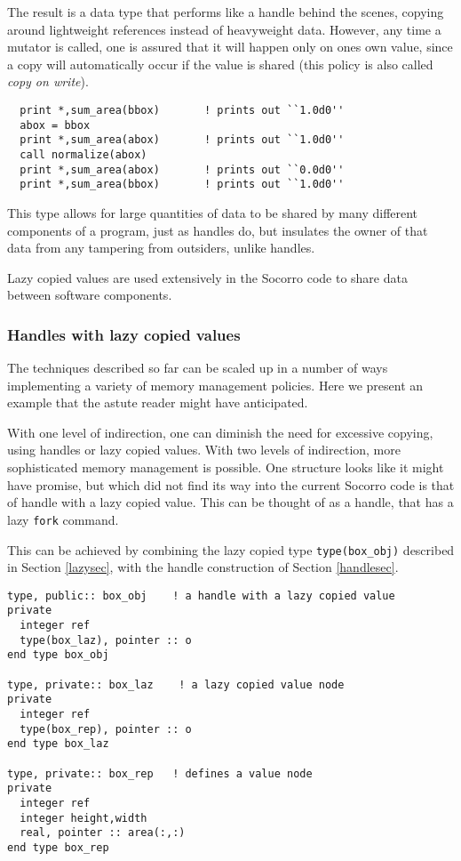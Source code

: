 The result is a data type that performs like a handle behind the
scenes, copying around lightweight references instead of heavyweight
data.  However, any time a mutator is called, one is assured that it
will happen only on ones own value, since a copy will automatically
occur if the value is shared (this policy is also called
{\em copy on write}).
\begin{verbatim}
  print *,sum_area(bbox)       ! prints out ``1.0d0''
  abox = bbox
  print *,sum_area(abox)       ! prints out ``1.0d0''
  call normalize(abox)
  print *,sum_area(abox)       ! prints out ``0.0d0''
  print *,sum_area(bbox)       ! prints out ``1.0d0''
\end{verbatim}

This type allows for large quantities of data to be shared by
many different components of a program, just as handles do, but
insulates the owner of that data from any tampering from outsiders,
unlike handles.

Lazy copied values are used extensively in the Socorro code to share data
between software components.

\subsubsection{Handles with lazy copied values}

The techniques described so far can be scaled up in a number of ways
implementing a variety of memory management policies.  Here we present
an example that the astute reader might have anticipated.

With one level of indirection, one can diminish the need for excessive
copying, using handles or lazy copied values.  With two levels of
indirection, more sophisticated memory management is possible.  One
structure looks like it might have promise, but which did not find its
way into the current Socorro code is that of handle with a lazy copied
value.  This can be thought of as a handle, that has a lazy
\verb+fork+ command.

This can be achieved by combining the lazy copied type
\verb+type(box_obj)+ described in Section \ref{lazysec}, with the
handle construction of Section \ref{handlesec}.

\begin{verbatim}
type, public:: box_obj    ! a handle with a lazy copied value
private
  integer ref
  type(box_laz), pointer :: o
end type box_obj

type, private:: box_laz    ! a lazy copied value node
private
  integer ref
  type(box_rep), pointer :: o
end type box_laz

type, private:: box_rep   ! defines a value node
private
  integer ref
  integer height,width
  real, pointer :: area(:,:)
end type box_rep
\end{verbatim}

